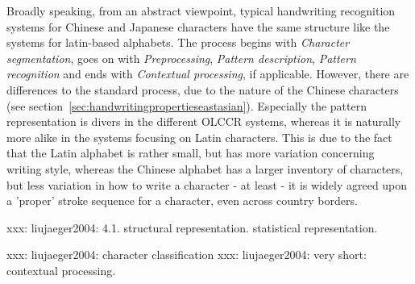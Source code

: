 Broadly speaking, from an abstract viewpoint, typical handwriting recognition 
systems for Chinese and Japanese characters have the same structure like the
systems for latin-based alphabets. The process begins with \emph{Character 
segmentation}, goes on with \emph{Preprocessing}, \emph{Pattern description}, 
\emph{Pattern recognition} and ends with \emph{Contextual processing}, 
if applicable. However, there are differences to the standard process, due to 
the nature of the Chinese characters (see 
section~\ref{sec:handwritingpropertieseastasian}).
Especially the pattern representation is divers in the different OLCCR systems,
whereas it is naturally more alike in the systems focusing on Latin characters.
This is due to the fact that the Latin alphabet is rather small, but has more
variation concerning writing style, whereas the Chinese alphabet has a larger 
inventory of characters, but less variation in how to write a character - at
least - it is widely agreed upon a 'proper' stroke sequence for a character,
even across country borders.

xxx: liujaeger2004: 4.1. structural representation. statistical representation.

xxx: liujaeger2004: character classification
xxx: liujaeger2004: very short: contextual processing.




